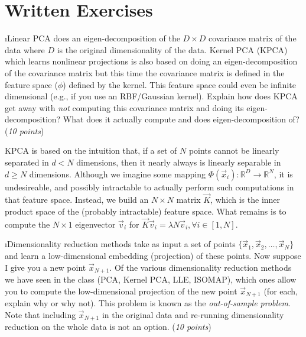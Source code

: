 \documentclass[fleqn]{article}
\begin{document}

\section{Written Exercises}

\bee

\i Linear PCA does an eigen-decomposition of the $D\times D$ covariance
matrix of the data where $D$ is the original dimensionality of the data.
Kernel PCA (KPCA) which learns nonlinear projections is also based on doing an
eigen-decomposition of the covariance matrix but this time the covariance
matrix is defined in the feature space ($\phi$) defined by the kernel. This 
feature space could even be infinite dimensional (e.g., if you use an 
RBF/Gaussian kernel). Explain how does KPCA get away with \emph{not} computing
this covariance matrix and doing its eigen-decomposition? What does it
actually compute and does eigen-decomposition of? (\emph{10 points})

\begin{solution}
KPCA is based on the intuition that, if a set of $N$ points cannot be linearly separated in $d < N$ dimensions, then it nearly always is linearly separable in $d \ge N$ dimensions. Although we imagine some mapping $\Phi (\vec{x}_i) : \mathbb{R}^D \rightarrow \mathbb{R}^N$, it is undesireable, and possibly intractable to actually perform such computations in that feature space. Instead, we build an $N \times N$ matrix $\vec{K}$, which is the inner product space of the (probably intractable) feature space. What remains is to compute the $N \times 1$ eigenvector $\vec{v}_i$ for $\vec{K} \vec{v}_i = \lambda N 	\vec{v}_i, \forall i \in [1,N]$.
\end{solution}

\i Dimensionality reduction methods take as input a set of points
$\{\vec{x}_1,\vec{x}_2,\ldots,\vec{x}_N\}$ and learn a low-dimensional
embedding (projection) of these points. Now suppose I give you a new point
$\vec{x}_{N+1}$. Of the various dimensionality reduction methods we 
have seen in the class (PCA, Kernel PCA, LLE, ISOMAP), which ones 
allow you to compute the low-dimensional projection of the new point
$\vec{x}_{N+1}$ (for each, explain why or why not). This problem is known
as the \emph{out-of-sample problem}. Note that including $\vec{x}_{N+1}$ in the original
data and re-running dimensionality reduction on the whole data is not an option.
(\emph{10 points})
\end{document}
